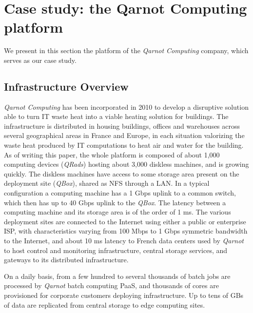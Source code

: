 \chapter{Case study: the Qarnot Computing platform}
\label{sec:platform}

We present in this section the platform of the \emph{Qarnot Computing} company, which serves as our case study.


\section{Infrastructure Overview}
\label{sec:qarnot}


\emph{Qarnot Computing} has been incorporated in 2010 to develop a disruptive solution able to turn IT waste heat into a viable heating solution for buildings.
The infrastructure is distributed in housing buildings, offices and warehouses across several geographical areas in France and Europe, in each situation valorizing the waste heat produced by IT computations to heat air and water for the building.
As of writing this paper, the whole platform is composed of about 1,000 computing devices (\emph{QRads}) hosting about 3,000 diskless machines, and is growing quickly.
The diskless machines have access to some storage area present on the deployment site (\emph{QBox}), shared as NFS through a LAN.
In a typical configuration a computing machine has a 1 Gbps uplink to a common switch, which then has up to 40 Gbps uplink to the \emph{QBox}.
The latency between a computing machine and its storage area is of the order of 1 ms.  The various deployment sites are connected to the Internet using either a public or enterprise ISP, with characteristics varying from 100 Mbps to 1 Gbps symmetric bandwidth to the Internet, and about 10 ms latency to French data centers used by \emph{Qarnot} to host control and monitoring infrastructure, central storage services, and gateways to its distributed infrastructure.

On a daily basis, from a few hundred to several thousands of batch jobs are processed by \emph{Qarnot} batch computing PaaS, and thousands of cores are provisioned for corporate customers deploying infrastructure. Up to tens of GBs of data are replicated from central storage to edge computing sites.

